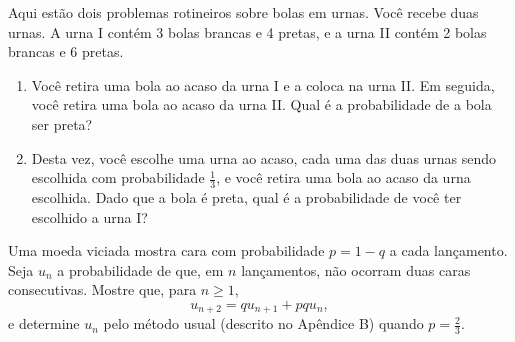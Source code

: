 \begin{exercise}\label{gw:exercicio:urnas}
  Aqui estão dois problemas rotineiros sobre bolas em urnas. Você recebe duas
  urnas. A urna I contém 3 bolas brancas e 4 pretas, e a urna II contém 2
  bolas brancas e 6 pretas.
  \begin{enumerate}[label=(\alph*)]
    \item Você retira uma bola ao acaso da urna I e a coloca na urna II. Em
          seguida, você retira uma bola ao acaso da urna II. Qual é a
          probabilidade de a bola ser preta?
    \item Desta vez, você escolhe uma urna ao acaso, cada uma das duas urnas
          sendo escolhida com probabilidade \(\tfrac{1}{3}\), e você retira uma
          bola ao acaso da urna escolhida. Dado que a bola é preta, qual é a
          probabilidade de você ter escolhido a urna I?
  \end{enumerate}
\end{exercise}

\begin{exercise}\label{gw:exercicio:moeda-viciada}
  Uma moeda viciada mostra cara com probabilidade \(p = 1 - q\) a cada
  lançamento. Seja \(u_n\) a probabilidade de que, em \(n\) lançamentos, não
  ocorram duas caras consecutivas. Mostre que, para \(n \ge 1\),
  \[
    u_{n+2} = q u_{n+1} + p q u_n,
  \]
  e determine \(u_n\) pelo método usual (descrito no Apêndice B) quando
  \(p = \tfrac{2}{3}\).
\end{exercise}
